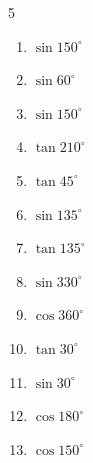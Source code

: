 \begin{multicols}{5}
\begin{enumerate}
\columnbreak %

  \item $\displaystyle \sin{150^\circ}$


  \item $\displaystyle \sin{60^\circ}$


  \item $\displaystyle \sin{150^\circ}$


  \item $\displaystyle \tan{210^\circ}$


  \item $\displaystyle \tan{45^\circ}$

        \phantom{$\displaystyle =1$}

  \item $\displaystyle \sin{135^\circ}$


  \item $\displaystyle \tan{135^\circ}$

        \phantom{$\displaystyle =-1$}

  \item $\displaystyle \sin{330^\circ}$


  \item $\displaystyle \cos{360^\circ}$

        \phantom{$\displaystyle =1$}

  \item $\displaystyle \tan{30^\circ}$


  \item $\displaystyle \sin{30^\circ}$


  \item $\displaystyle \cos{180^\circ}$

        \phantom{$\displaystyle =-1$}

  \item $\displaystyle \cos{150^\circ}$


\end{enumerate}
\end{multicols}
